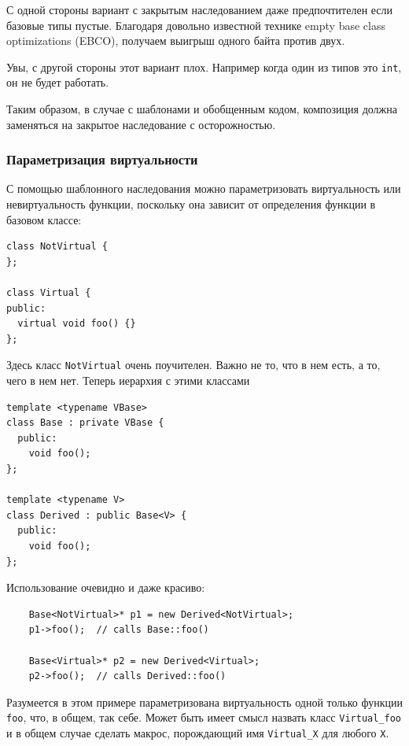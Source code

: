 \documentclass[a4paper,12pt,oneside]{article}
\begin{document}
С одной стороны вариант с закрытым наследованием даже предпочтителен если базовые типы пустые. Благодаря довольно известной технике empty base class optimizations (EBCO), получаем выигрыш одного байта против двух.

Увы, с другой стороны этот вариант плох. Например когда один из типов это \lstinline!int!, он не будет работать.

Таким образом, в случае с шаблонами и обобщенным кодом, композиция должна заменяться на закрытое наследование с осторожностью.

\subsubsection{Параметризация виртуальности}

С помощью шаблонного наследования можно параметризовать виртуальность или невиртуальность функции, поскольку она зависит от определения функции в базовом классе:

\begin{lstlisting}
class NotVirtual { 
}; 

class Virtual { 
public: 
  virtual void foo() {} 
}; 
\end{lstlisting}

Здесь класс \lstinline!NotVirtual! очень поучителен. Важно не то, что в нем есть, а то, чего в нем нет. Теперь иерархия с этими классами

\begin{lstlisting}
template <typename VBase> 
class Base : private VBase { 
  public: 
    void foo();
}; 

template <typename V> 
class Derived : public Base<V> { 
  public: 
    void foo();
}; 
\end{lstlisting}

Использование очевидно и даже красиво:

\begin{lstlisting}
    Base<NotVirtual>* p1 = new Derived<NotVirtual>; 
    p1->foo();  // calls Base::foo() 

    Base<Virtual>* p2 = new Derived<Virtual>; 
    p2->foo();  // calls Derived::foo() 
\end{lstlisting}

Разумеется в этом примере параметризована виртуальность одной только функции \lstinline!foo!, что, в общем, так себе. Может быть имеет смысл назвать класс \lstinline!Virtual_foo! и в общем случае сделать макрос, порождающий имя \lstinline!Virtual_X! для любого \lstinline!X!.
\end{document}
